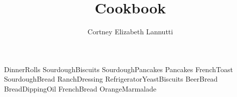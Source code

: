 \documentclass[a4paper, titlepage]{book}
\title{Cookbook}
\author{Cortney Elizabeth Lannutti}
\date{}
\begin{document}
\maketitle
{}
\tableofcontents
\newpage
{}

{DinnerRolls}
{SourdoughBiscuits}
{SourdoughPancakes}
{Pancakes}
{FrenchToast}
{SourdoughBread}
{RanchDressing}
{RefrigeratorYeastBiscuits}
{BeerBread}
{BreadDippingOil}
{FrenchBread}
{OrangeMarmalade}
\end{document}
